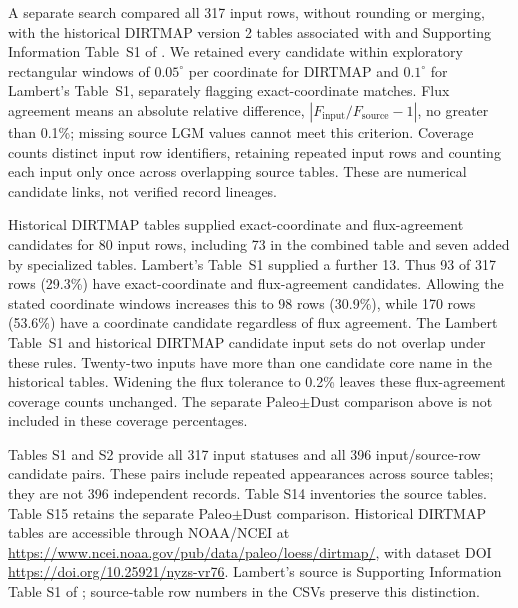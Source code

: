 \documentclass[11pt,a4paper]{article}
\begin{document}
A separate search compared all 317 input rows, without rounding or merging, with the historical DIRTMAP version 2 tables associated with \citet{Kohfeld2001} and Supporting Information Table~S1 of \citet{Lambert2015}. We retained every candidate within exploratory rectangular windows of $0.05^{\circ}$ per coordinate for DIRTMAP and $0.1^{\circ}$ for Lambert's Table~S1, separately flagging exact-coordinate matches. Flux agreement means an absolute relative difference, $|F_{\mathrm{input}}/F_{\mathrm{source}}-1|$, no greater than 0.1\%; missing source LGM values cannot meet this criterion. Coverage counts distinct input row identifiers, retaining repeated input rows and counting each input only once across overlapping source tables. These are numerical candidate links, not verified record lineages.

Historical DIRTMAP tables supplied exact-coordinate and flux-agreement candidates for 80 input rows, including 73 in the combined table and seven added by specialized tables. Lambert's Table~S1 supplied a further 13. Thus 93 of 317 rows (29.3\%) have exact-coordinate and flux-agreement candidates. Allowing the stated coordinate windows increases this to 98 rows (30.9\%), while 170 rows (53.6\%) have a coordinate candidate regardless of flux agreement. The Lambert Table~S1 and historical DIRTMAP candidate input sets do not overlap under these rules. Twenty-two inputs have more than one candidate core name in the historical tables. Widening the flux tolerance to 0.2\% leaves these flux-agreement coverage counts unchanged. The separate Paleo$\pm$Dust comparison above is not included in these coverage percentages.

Tables S1 and S2 provide all 317 input statuses and all 396 input/source-row candidate pairs. These pairs include repeated appearances across source tables; they are not 396 independent records. Table S14 inventories the source tables. Table S15 retains the separate Paleo$\pm$Dust comparison. Historical DIRTMAP tables are accessible through NOAA/NCEI at \url{https://www.ncei.noaa.gov/pub/data/paleo/loess/dirtmap/}, with dataset DOI \url{https://doi.org/10.25921/nyzs-vr76}. Lambert's source is Supporting Information Table S1 of \citet{Lambert2015}; source-table row numbers in the CSVs preserve this distinction.
\end{document}
